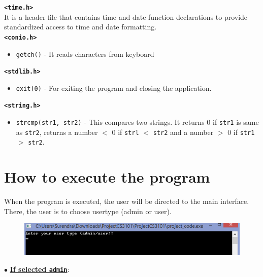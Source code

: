 \documentclass[12pt]{article}
\begin{document}
\noindent \textbf{\texttt{<time.h>}}\\

It is a header file that contains time and date function declarations to provide standardized access to time and date formatting.\\

\noindent \textbf{\texttt{<conio.h>}}

\begin{itemize}
\item \texttt{getch()} - It reads characters from keyboard
\end{itemize}

\noindent \textbf{\texttt{<stdlib.h>}}

\begin{itemize}
\item \texttt{exit(0)} - For exiting the program and closing the application.
\end{itemize}

\noindent \textbf{\texttt{<string.h>}}

\begin{itemize}

\item \texttt{strcmp(str1, str2)} - This compares two strings. It returns 0 if \texttt{str1} is same as \texttt{str2}, returns a number $<$ 0 if \texttt{strl} $<$ \texttt{str2} and a number $>$ 0 if \texttt{str1} $>$ \texttt{str2}.
\end{itemize}

\section{How to execute the program}
When the program is executed, the user will be directed to the main interface. There, the user is to choose usertype (admin or user).

\begin{figure}[!h]
\centering
\includegraphics[scale=0.8]{ask for user}
\end{figure}

$\bullet$ \underline{\textbf{If selected \texttt{admin}}}:\\
\end{document}
